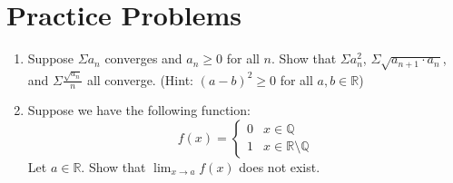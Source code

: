\documentclass[12pt]{article}
\theoremstyle{definition}
\theoremstyle{named}
\begin{document}
\section*{Practice Problems}

\begin{enumerate}
    \item Suppose $\Sigma a_n$ converges and $a_n \geq 0$ for all $n$. Show that $\Sigma a_n^2$, $\Sigma \sqrt{a_{n+1} \cdot a_n}$, and $\Sigma \frac{\sqrt{a_n}}{n}$ all converge. (Hint: $(a-b)^2 \geq 0$ for all $a, b \in \mathbb{R}$) 
    \item Suppose we have the following function: 
    $$
    f(x) = \begin{cases} 
            0 & x \in \mathbb{Q} \\
            1 & x \in \mathbb{R} \setminus \mathbb{Q}
        \end{cases}
    $$
    Let $a \in \mathbb{R}$. Show that $\lim_{x \to a} f(x)$ does not exist. 
\end{enumerate}
\end{document}
